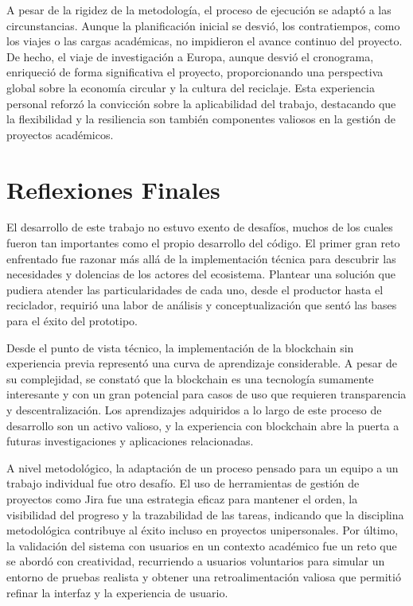A pesar de la rigidez de la metodología, el proceso de ejecución se adaptó a las circunstancias. Aunque la planificación inicial se desvió, los contratiempos, como los viajes o las cargas académicas, no impidieron el avance continuo del proyecto. De hecho, el viaje de investigación a Europa, aunque desvió el cronograma, enriqueció de forma significativa el proyecto, proporcionando una perspectiva global sobre la economía circular y la cultura del reciclaje. Esta experiencia personal reforzó la convicción sobre la aplicabilidad del trabajo, destacando que la flexibilidad y la resiliencia son también componentes valiosos en la gestión de proyectos académicos.

\section{Reflexiones Finales}

El desarrollo de este trabajo no estuvo exento de desafíos, muchos de los cuales fueron tan importantes como el propio desarrollo del código. El primer gran reto enfrentado fue razonar más allá de la implementación técnica para descubrir las necesidades y dolencias de los actores del ecosistema. Plantear una solución que pudiera atender las particularidades de cada uno, desde el productor hasta el reciclador, requirió una labor de análisis y conceptualización que sentó las bases para el éxito del prototipo.

Desde el punto de vista técnico, la implementación de la blockchain sin experiencia previa representó una curva de aprendizaje considerable. A pesar de su complejidad, se constató que la blockchain es una tecnología sumamente interesante y con un gran potencial para casos de uso que requieren transparencia y descentralización. Los aprendizajes adquiridos a lo largo de este proceso de desarrollo son un activo valioso, y la experiencia con blockchain abre la puerta a futuras investigaciones y aplicaciones relacionadas.

A nivel metodológico, la adaptación de un proceso pensado para un equipo a un trabajo individual fue otro desafío. El uso de herramientas de gestión de proyectos como Jira fue una estrategia eficaz para mantener el orden, la visibilidad del progreso y la trazabilidad de las tareas, indicando que la disciplina metodológica contribuye al éxito incluso en proyectos unipersonales. Por último, la validación del sistema con usuarios en un contexto académico fue un reto que se abordó con creatividad, recurriendo a usuarios voluntarios para simular un entorno de pruebas realista y obtener una retroalimentación valiosa que permitió refinar la interfaz y la experiencia de usuario.

